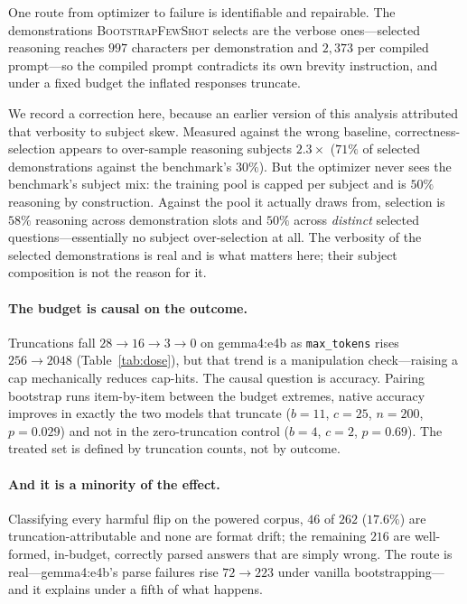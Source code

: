 \documentclass[11pt]{article}
\newcommand{\bsfs}{\textsc{BootstrapFewShot}}
\begin{document}
One route from optimizer to failure is identifiable and repairable. The demonstrations
\bsfs{} selects are the verbose ones---selected reasoning reaches $997$ characters per
demonstration and $2{,}373$ per compiled prompt---so the compiled prompt contradicts its
own brevity instruction, and under a fixed budget the inflated responses truncate.

We record a correction here, because an earlier version of this analysis attributed that
verbosity to subject skew. Measured against the wrong baseline, correctness-selection
appears to over-sample reasoning subjects $2.3\times$ ($71\%$ of selected demonstrations
against the benchmark's $30\%$). But the optimizer never sees the benchmark's subject
mix: the training pool is capped per subject and is $50\%$ reasoning by construction.
Against the pool it actually draws from, selection is $58\%$ reasoning across
demonstration slots and $50\%$ across \emph{distinct} selected questions---essentially
no subject over-selection at all. The verbosity of the selected demonstrations is real
and is what matters here; their subject composition is not the reason for it.

\paragraph{The budget is causal on the outcome.} Truncations fall
$28{\to}16{\to}3{\to}0$ on gemma4:e4b as \texttt{max\_tokens} rises $256{\to}2048$
(Table~\ref{tab:dose}), but that trend is a manipulation check---raising a cap
mechanically reduces cap-hits. The causal question is accuracy. Pairing bootstrap runs
item-by-item between the budget extremes, native accuracy improves in exactly the two
models that truncate ($b{=}11$, $c{=}25$, $n{=}200$, $p{=}0.029$) and not in the
zero-truncation control ($b{=}4$, $c{=}2$, $p{=}0.69$). The treated set is defined by
truncation counts, not by outcome.

\paragraph{And it is a minority of the effect.} Classifying every harmful flip on the
powered corpus, $46$ of $262$ ($17.6\%$) are truncation-attributable and none are format
drift; the remaining $216$ are well-formed, in-budget, correctly parsed answers that are
simply wrong. The route is real---gemma4:e4b's parse failures rise $72{\to}223$ under
vanilla bootstrapping---and it explains under a fifth of what happens.
\end{document}
